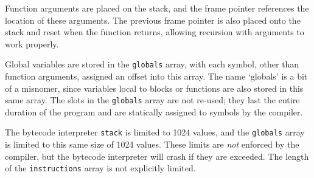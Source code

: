 Function arguments are placed on the stack, and the frame pointer references the location of these arguments.  The previous frame pointer is also placed onto the stack and reset when the function returns, allowing recursion with arguments to work properly.

Global variables are stored in the \texttt{globals} array, with each symbol, other than function arguments, assigned an offset into this array.  The name `globals' is a bit of a misnomer, since variables local to blocks or functions are also stored in this same array.  The slots in the \texttt{globals} array are not re-used; they last the entire duration of the program and are statically assigned to symbols by the compiler.

The bytecode interpreter \texttt{stack} is limited to 1024 values, and the \texttt{globals} array is limited to this same size of 1024 values.  These limits are \emph{not} enforced by the compiler, but the bytecode interpreter will crash if they are exceeded.  The length of the \texttt{instructions} array is not explicitly limited.
